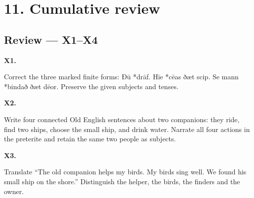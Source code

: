 \section*{11. Cumulative review}

\subsection*{Review — X1–X4}

\par\begin{minipage}{\linewidth}\raggedright
\textbf{X1.}

Correct the three marked finite forms: Ðū *drāf. Hīe *cēas ðæt scip. Se mann *bindað ðæt dēor. Preserve the given subjects and tenses.

\end{minipage}\par\addvspace{4pt}

\par\begin{minipage}{\linewidth}\raggedright
\textbf{X2.}

Write four connected Old English sentences about two companions: they ride, find two ships, choose the small ship, and drink water. Narrate all four actions in the preterite and retain the same two people as subjects.

\end{minipage}\par\addvspace{4pt}

\par\begin{minipage}{\linewidth}\raggedright
\textbf{X3.}

Translate “The old companion helps my birds. My birds sing well. We found his small ship on the shore.” Distinguish the helper, the birds, the finders and the owner.

\end{minipage}\par\addvspace{4pt}

